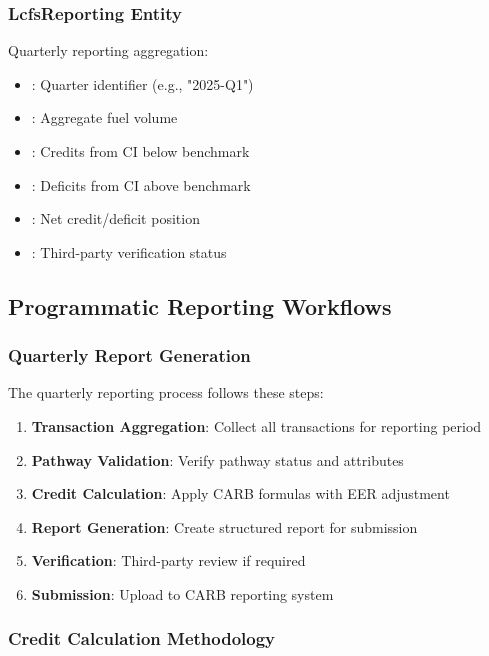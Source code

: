 \subsubsection{LcfsReporting Entity}

Quarterly reporting aggregation:

\begin{itemize}
    \item {}: Quarter identifier (e.g., "2025-Q1")
    \item {}: Aggregate fuel volume
    \item {}: Credits from CI below benchmark
    \item {}: Deficits from CI above benchmark
    \item {}: Net credit/deficit position
    \item {}: Third-party verification status
\end{itemize}

\subsection{Programmatic Reporting Workflows}
\label{sec:lcfs-workflows}

\subsubsection{Quarterly Report Generation}

The quarterly reporting process follows these steps:

\begin{enumerate}
    \item \textbf{Transaction Aggregation}: Collect all transactions for reporting period
    \item \textbf{Pathway Validation}: Verify pathway status and attributes
    \item \textbf{Credit Calculation}: Apply CARB formulas with EER adjustment
    \item \textbf{Report Generation}: Create structured report for submission
    \item \textbf{Verification}: Third-party review if required
    \item \textbf{Submission}: Upload to CARB reporting system
\end{enumerate}

\subsubsection{Credit Calculation Methodology}


